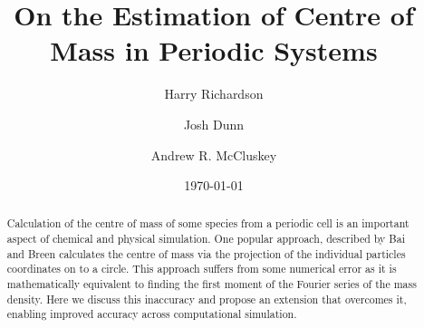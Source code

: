 \documentclass[reprint,superscriptaddress,nobibnotes,amsmath,amssymb,aip]{revtex4-2}
\newcommand{\papertitle}{On the Estimation of Centre of Mass in Periodic Systems}
\begin{document}
\let\oldaddcontentsline\addcontentsline
\renewcommand{\addcontentsline}[3]{}


\title[Accurate Centre of Mass Estimation]{\papertitle}

\author{Harry Richardson}
\author{Josh Dunn}
\author{Andrew R. McCluskey}

\date{\today}

\begin{abstract}
Calculation of the centre of mass of some species from a periodic cell is an important aspect of chemical and physical simulation. 
One popular approach, described by Bai and Breen calculates the centre of mass via the projection of the individual particles coordinates on to a circle.
This approach suffers from some numerical error as it is mathematically equivalent to finding the first moment of the Fourier series of the mass density. 
Here we discuss this inaccuracy and propose an extension that overcomes it, enabling improved accuracy across computational simulation. 
\end{abstract}

\maketitle
\end{document}
